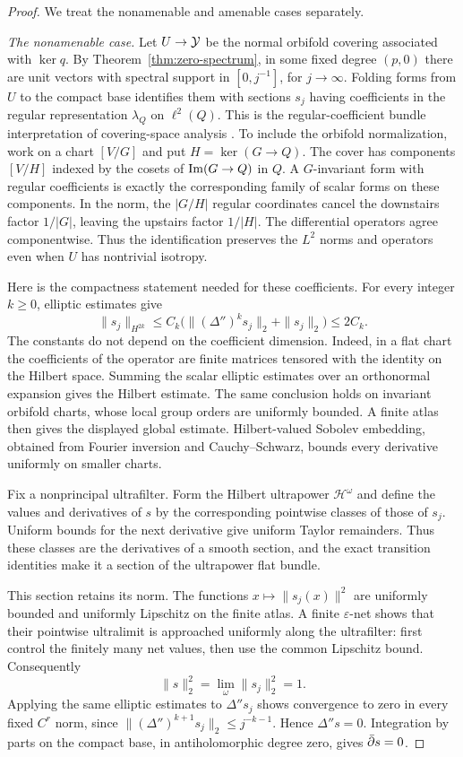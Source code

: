 \begin{proof}
We treat the nonamenable and amenable cases separately.

\medskip\noindent\emph{The nonamenable case.}
Let \(U\to\mathcal Y\) be the normal orbifold covering associated with
\(\ker q\). By Theorem~\ref{thm:zero-spectrum}, in some fixed degree
\((p,0)\) there are unit vectors with spectral support in
\([0,j^{-1}]\), for \(j\to\infty\). Folding forms from \(U\) to the
compact base identifies them with sections \(s_j\) having coefficients
in the regular representation \(\lambda_Q\) on \(\ell^2(Q)\).
This is the regular-coefficient bundle interpretation of covering-space
analysis \cite[Section~6.1]{Atiyah1976}. To include the orbifold
normalization, work on a chart \([V/G]\) and put
\(H=\ker(G\to Q)\). The cover has components \([V/H]\) indexed by
the cosets of \(\operatorname{Im}(G\to Q)\) in \(Q\). A \(G\)-invariant form with
regular coefficients is exactly the corresponding family of scalar
forms on these components. In the norm, the \(|G/H|\) regular
coordinates cancel the downstairs factor \(1/|G|\), leaving the
upstairs factor \(1/|H|\). The differential operators agree
componentwise. Thus the identification preserves the \(L^2\) norms
and operators even when \(U\) has nontrivial isotropy.

Here is the compactness statement needed for these coefficients.
For every integer \(k\ge0\), elliptic estimates give
\[
 \|s_j\|_{H^{2k}}
 \le C_k\bigl(\|(\Delta'')^k s_j\|_2+\|s_j\|_2\bigr)
 \le 2C_k.
\]
The constants do not depend on the coefficient dimension. Indeed, in
a flat chart the coefficients of the operator are finite matrices
tensored with the identity on the Hilbert space. Summing the scalar
elliptic estimates over an orthonormal expansion gives the Hilbert
estimate. The same conclusion holds on invariant orbifold charts,
whose local group orders are uniformly bounded. A finite atlas then
gives the displayed global estimate. Hilbert-valued Sobolev embedding,
obtained from Fourier inversion and Cauchy--Schwarz, bounds every
derivative uniformly on smaller charts.

Fix a nonprincipal ultrafilter. Form the Hilbert ultrapower
\(\mathcal H^\omega\) and define the values and derivatives of \(s\)
by the corresponding pointwise classes of those of \(s_j\).
Uniform bounds for the next derivative give uniform Taylor
remainders. Thus these classes are the derivatives of a smooth
section, and the exact transition identities make it a section of
the ultrapower flat bundle.

This section retains its norm. The functions
\(x\mapsto\|s_j(x)\|^2\) are uniformly bounded and uniformly Lipschitz
on the finite atlas. A finite \(\varepsilon\)-net shows that their
pointwise ultralimit is approached uniformly along the ultrafilter:
first control the finitely many net values, then use the common
Lipschitz bound. Consequently
\[
 \|s\|_2^2=\lim_\omega\|s_j\|_2^2=1.
\]
Applying the same elliptic estimates to \(\Delta''s_j\) shows
convergence to zero in every fixed \(C^r\) norm, since
\(\|(\Delta'')^{k+1}s_j\|_2\le j^{-k-1}\).
Hence \(\Delta''s=0\). Integration by parts on the compact base,
in antiholomorphic degree zero, gives \(\bar\partial s=0\).


\end{proof}
